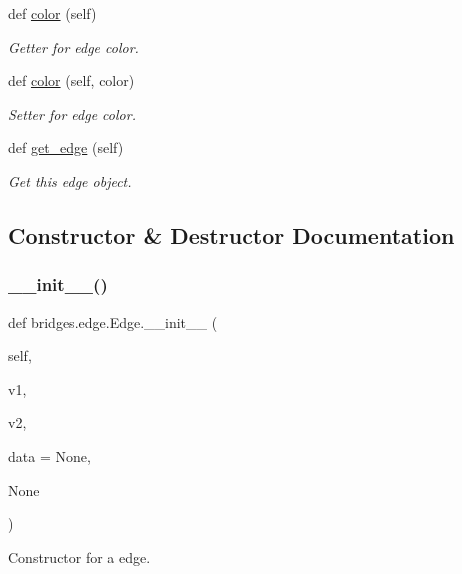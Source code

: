 \begin{DoxyCompactItemize}
def \hyperlink{classbridges_1_1edge_1_1_edge_a24a4845aeae4ca6fc432b6d0b7fa78c2}{color} (self)
\begin{DoxyCompactList}\small\item\em Getter for edge color. \end{DoxyCompactList}\item 
def \hyperlink{classbridges_1_1edge_1_1_edge_a81ccb5ffd5838829e1a2217846c4df77}{color} (self, color)
\begin{DoxyCompactList}\small\item\em Setter for edge color. \end{DoxyCompactList}\item 
def \hyperlink{classbridges_1_1edge_1_1_edge_a406b906ea8e177a6e54f6c794c04df3d}{get\+\_\+edge} (self)
\begin{DoxyCompactList}\small\item\em Get this edge object. \end{DoxyCompactList}\end{DoxyCompactItemize}


\subsection{Constructor \& Destructor Documentation}
\mbox{\label{classbridges_1_1edge_1_1_edge_a3c5cbf52efec4e42a242bbcee7bc8051}} 
\subsubsection{\texorpdfstring{\+\_\+\+\_\+init\+\_\+\+\_\+()}{\_\_init\_\_()}}
{\footnotesize\ttfamily def bridges.\+edge.\+Edge.\+\_\+\+\_\+init\+\_\+\+\_\+ (\begin{DoxyParamCaption}\item[{}]{self,  }\item[{}]{v1,  }\item[{}]{v2,  }\item[{}]{data = {\ttfamily None},  }\item[{}]{None }\end{DoxyParamCaption})}



Constructor for a edge. 



